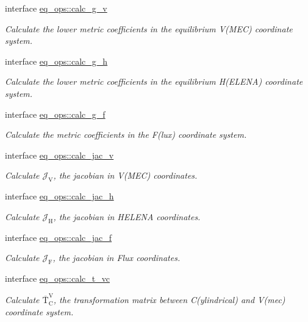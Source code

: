 \begin{DoxyCompactItemize}
interface \hyperlink{interfaceeq__ops_1_1calc__g__v}{eq\+\_\+ops\+::calc\+\_\+g\+\_\+v}
\begin{DoxyCompactList}\small\item\em Calculate the lower metric coefficients in the equilibrium V(\+M\+E\+C) coordinate system. \end{DoxyCompactList}\item 
interface \hyperlink{interfaceeq__ops_1_1calc__g__h}{eq\+\_\+ops\+::calc\+\_\+g\+\_\+h}
\begin{DoxyCompactList}\small\item\em Calculate the lower metric coefficients in the equilibrium H(\+E\+L\+E\+N\+A) coordinate system. \end{DoxyCompactList}\item 
interface \hyperlink{interfaceeq__ops_1_1calc__g__f}{eq\+\_\+ops\+::calc\+\_\+g\+\_\+f}
\begin{DoxyCompactList}\small\item\em Calculate the metric coefficients in the F(lux) coordinate system. \end{DoxyCompactList}\item 
interface \hyperlink{interfaceeq__ops_1_1calc__jac__v}{eq\+\_\+ops\+::calc\+\_\+jac\+\_\+v}
\begin{DoxyCompactList}\small\item\em Calculate $\mathcal{J}_\text{V}$, the jacobian in V(\+M\+E\+C) coordinates. \end{DoxyCompactList}\item 
interface \hyperlink{interfaceeq__ops_1_1calc__jac__h}{eq\+\_\+ops\+::calc\+\_\+jac\+\_\+h}
\begin{DoxyCompactList}\small\item\em Calculate $\mathcal{J}_\text{H}$, the jacobian in H\+E\+L\+E\+NA coordinates. \end{DoxyCompactList}\item 
interface \hyperlink{interfaceeq__ops_1_1calc__jac__f}{eq\+\_\+ops\+::calc\+\_\+jac\+\_\+f}
\begin{DoxyCompactList}\small\item\em Calculate $\mathcal{J}_\text{F}$, the jacobian in Flux coordinates. \end{DoxyCompactList}\item 
interface \hyperlink{interfaceeq__ops_1_1calc__t__vc}{eq\+\_\+ops\+::calc\+\_\+t\+\_\+vc}
\begin{DoxyCompactList}\small\item\em Calculate $\overline{\text{T}}_\text{C}^\text{V}$, the transformation matrix between C(ylindrical) and V(mec) coordinate system. \end{DoxyCompactList}\item 

\end{DoxyCompactItemize}
